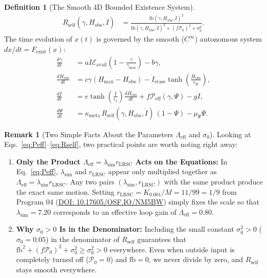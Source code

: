 \documentclass[11pt,a4paper]{article}
\theoremstyle{definition}
\newtheorem{definition}[theorem]{Definition}
\newtheorem{remark}[theorem]{Remark}
\begin{document}
\begin{definition}[The Smooth 4D Bounded Existence System]
\begin{align}
\label{eq:Rself}
R_{\mathrm{self}}(\gamma, H_{\mathrm{obs}}, \dot{I}) &= \frac{\mathrm{fb}(\gamma, H_{\mathrm{obs}}, \dot{I})^2}{\mathrm{fb}(\gamma, H_{\mathrm{obs}}, \dot{I})^2 + (f\mathcal{P}_0)^2 + \sigma_0^2}.
\end{align}
The time evolution of $x(t)$ is governed by the smooth ($C^\infty$) autonomous system $dx/dt = F_{\mathrm{exist}}(x)$:
\begin{align}
\label{eq:B1}
\frac{d\gamma}{dt} &= a\dot{I}\mathcal{E}_{\mathrm{avail}}\!\left(1 - \frac{\gamma}{\gamma_{\max}}\right) - b\gamma, \\
\label{eq:B2}
\frac{dH_{\mathrm{obs}}}{dt} &= c\gamma(H_{\max} - H_{\mathrm{obs}}) - \dot{I}_{\mathrm{erase}}\tanh\!\left(\frac{H_{\mathrm{obs}}}{\epsilon_H}\right), \\
\label{eq:B3}
\frac{d\dot{I}}{dt} &= e\tanh\!\left(\frac{\dot{I}}{\epsilon_I}\right)\frac{dH_{\mathrm{obs}}}{dt} + f\mathcal{P}_{\mathrm{eff}}(\gamma, \Psi) - g\dot{I}, \\
\label{eq:B4}
\frac{d\Psi}{dt} &= \kappa_{\mathrm{meta}}\,R_{\mathrm{self}}(\gamma, H_{\mathrm{obs}}, \dot{I})\,(1 - \Psi) - \mu_\Psi \Psi.
\end{align}
\end{definition}

\begin{remark}[Two Simple Facts About the Parameters $\Lambda_{\mathrm{eff}}$ and $\sigma_0$]
\label{rem:transparency}
Looking at Eqs.~\eqref{eq:Peff}--\eqref{eq:Rself}, two practical points are worth noting right away:
\begin{enumerate}
  \item \textbf{Only the Product $\Lambda_{\mathrm{eff}} = \lambda_{\mathrm{sim}}r_{\mathrm{LRSC}}$ Acts on the Equations:} In Eq.~\eqref{eq:Peff}, $\lambda_{\mathrm{sim}}$ and $r_{\mathrm{LRSC}}$ appear only multiplied together as $\Lambda_{\mathrm{eff}} = \lambda_{\mathrm{sim}}r_{\mathrm{LRSC}}$. Any two pairs $(\lambda_{\mathrm{sim}}, r_{\mathrm{LRSC}})$ with the same product produce the exact same motion. Setting $r_{\mathrm{LRSC}} = K_{0.001}/M = 11/99 = 1/9$ from Program 04 (\href{https://doi.org/10.17605/OSF.IO/NM5BW}{DOI: 10.17605/OSF.IO/NM5BW}) simply fixes the scale so that $\lambda_{\mathrm{sim}} = 7.20$ corresponds to an effective loop gain of $\Lambda_{\mathrm{eff}} = 0.80$.
  \item \textbf{Why $\sigma_0 > 0$ Is in the Denominator:} Including the small constant $\sigma_0^2 > 0$ ($\sigma_0 = 0.05$) in the denominator of $R_{\mathrm{self}}$ guarantees that $\mathrm{fb}^2 + (f\mathcal{P}_0)^2 + \sigma_0^2 \ge \sigma_0^2 > 0$ everywhere. Even when outside input is completely turned off ($\mathcal{P}_0 = 0$) and $\mathrm{fb} = 0$, we never divide by zero, and $R_{\mathrm{self}}$ stays smooth everywhere.
\end{enumerate}
\end{remark}
\end{document}
